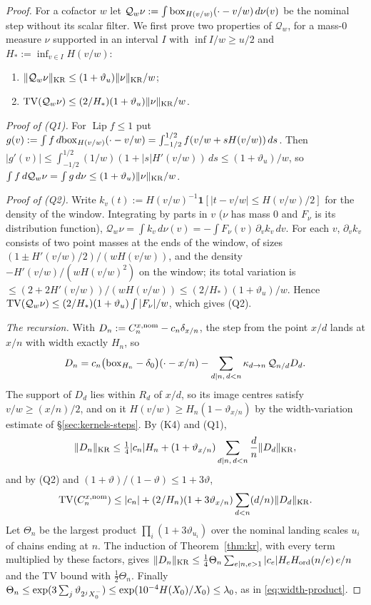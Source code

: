 \begin{proof}
For a cofactor $w$ let $\mathcal Q_w\nu:=\int\mathrm{box}_{H(v/w)}(\cdot-v/w)\,d\nu(v)$ be the nominal step without its scalar filter.
We first prove two properties of $\mathcal Q_w$, for a mass-$0$ measure $\nu$ supported in an interval $I$ with
$\inf I/w\ge u/2$ and $H_*:=\inf_{v\in I}H(v/w)$:
\begin{enumerate}[label=(Q\arabic*)]
\item $\lVert \mathcal Q_w\nu\rVert_{\mathrm{KR}}\le(1+\vartheta_u)\lVert \nu\rVert_{\mathrm{KR}}/w$;
\item $\operatorname{TV}(\mathcal Q_w\nu)\le(2/H_*)(1+\vartheta_u)\lVert \nu\rVert_{\mathrm{KR}}/w$.
\end{enumerate}
\emph{Proof of (Q1).} For $\operatorname{Lip}f\le1$ put $g(v):=\int f\,d\mathrm{box}_{H(v/w)}(\cdot-v/w)=\int_{-1/2}^{1/2}f(v/w+sH(v/w))\,ds$.
Then $|g'(v)|\le\int_{-1/2}^{1/2}(1/w)(1+|s|H'(v/w))\,ds\le(1+\vartheta_u)/w$, so
$\int f\,d\mathcal Q_w\nu=\int g\,d\nu\le(1+\vartheta_u)\lVert \nu\rVert_{\mathrm{KR}}/w$.

\emph{Proof of (Q2).} Write $k_v(t):=H(v/w)^{-1}\mathbf 1[|t-v/w|\le H(v/w)/2]$ for the density of the window. Integrating
by parts in $v$ ($\nu$ has mass $0$ and $F_\nu$ is its distribution function),
$\mathcal Q_w\nu=\int k_v\,d\nu(v)=-\int F_\nu(v)\,\partial_vk_v\,dv$. For each $v$, $\partial_vk_v$ consists of two point
masses at the ends of the window, of sizes $(1\pm H'(v/w)/2)/(wH(v/w))$, and the density $-H'(v/w)/(wH(v/w)^2)$ on the window;
its total variation is $\le(2+2H'(v/w))/(wH(v/w))\le(2/H_*)(1+\vartheta_u)/w$. Hence
$\operatorname{TV}(\mathcal Q_w\nu)\le(2/H_*)(1+\vartheta_u)\int|F_\nu|/w$, which gives (Q2).

\emph{The recursion.} With $D_n:=C_n^{x,\mathrm{nom}}-c_n\delta_{x/n}$, the step from the point $x/d$ lands at $x/n$ with width
exactly $H_n$, so
\[
  D_n=c_n\bigl(\mathrm{box}_{H_n}-\delta_0\bigr)(\cdot-x/n)-\sum_{d\mid n,\,d<n}\kappa_{d\to n}\,\mathcal Q_{n/d}D_d .
\]
The support of $D_d$ lies within $R_d$ of $x/d$, so its image centres satisfy $v/w\ge(x/n)/2$, and on it
$H(v/w)\ge H_n(1-\vartheta_{x/n})$ by the width-variation estimate of \S\ref{sec:kernels-steps}. By (K4) and (Q1),
\[
  \lVert D_n\rVert_{\mathrm{KR}}\le\tfrac14|c_n|H_n+(1+\vartheta_{x/n})\sum_{d\mid n,\,d<n}\frac dn\lVert D_d\rVert_{\mathrm{KR}},
\]
and by (Q2) and $(1+\vartheta)/(1-\vartheta)\le1+3\vartheta$,
\[
  \operatorname{TV}(C_n^{x,\mathrm{nom}})\le|c_n|+(2/H_n)(1+3\vartheta_{x/n})\sum_{d<n}(d/n)\lVert D_d\rVert_{\mathrm{KR}}.
\]
Let $\Theta_n$ be the largest
product $\prod_i(1+3\vartheta_{u_i})$ over the nominal landing scales $u_i$ of chains ending at $n$. The induction of
Theorem~\ref{thm:kr}, with every term multiplied by these factors, gives
$\lVert D_n\rVert_{\mathrm{KR}}\le\frac14\Theta_n\sum_{e\mid n,e>1}|c_e|H_eH_{\mathrm{ord}}(n/e)\,e/n$ and the TV bound with $\frac12\Theta_n$. Finally
$\Theta_n\le\exp(3\sum_j\vartheta_{2^jX_0^{-}})\le\exp(10^{-4}H(X_0)/X_0)\le\lambda_0$, as in \eqref{eq:width-product}.
\end{proof}

